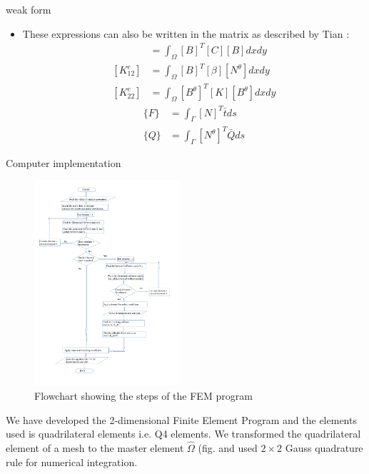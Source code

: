 \documentclass{beamer}
\begin{document}
\begin{frame}[t,fragile]{weak form}
    \tiny
\begin{itemize}
    \item These expressions can also be written in the matrix as described by Tian \cite{tian}:
\begin{align}
    [K_{11}^e]&=\int_{\Omega}[B]^T[C][B]dxdy\\
    [K_{12}^e]&=\int_{\Omega}[B]^T[\beta][N^{\theta}]dxdy\\
    [K_{22}^e]&=\int_{\Omega}[B^{\theta}]^T[K][B^{\theta}]dxdy
\end{align}
\begin{align}
    \{F\}&=\int_\Gamma [N]^T{\bar{t}}ds\\
    \{Q\}&=\int_\Gamma [N^{\theta}]^T\bar{Q}ds
\end{align}
\end{itemize}
\end{frame}
\begin{frame}[t,fragile]{Computer implementation}
\begin{figure}
  \begin{center}
      \vspace{-1.3cm}
\includegraphics[width=0.48\textwidth]{flow_chart.pdf}
  \end{center}
\caption{Flowchart showing the steps of the FEM program}
\end{figure}
We have developed the 2-dimensional Finite Element Program and the elements used is quadrilateral elements i.e. Q4 elements. We transformed the quadrilateral element of a mesh to the master element $\hat{\Omega}$ (fig. and used $2\times 2$ Gauss quadrature rule for numerical integration.

\end{frame}
\end{document}
